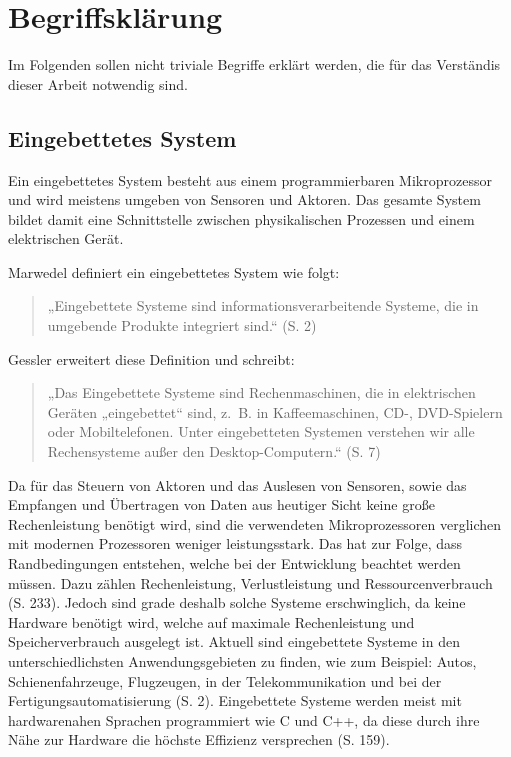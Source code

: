 \chapter{Begriffsklärung}
Im Folgenden sollen nicht triviale Begriffe erklärt werden, die für das Verständis dieser Arbeit notwendig sind.

\section{Eingebettetes System}
Ein eingebettetes System besteht aus einem programmierbaren Mikroprozessor und wird meistens umgeben von Sensoren und Aktoren. Das gesamte System bildet damit eine Schnittstelle zwischen physikalischen Prozessen und einem elektrischen Gerät.

Marwedel definiert ein eingebettetes System wie folgt:
\begin{quote}
    „Eingebettete Systeme sind informationsverarbeitende Systeme, die in umgebende Produkte integriert sind.“ (S. 2)\cite{marwedelEingebetteteSystemeGrundlagen2021}
\end{quote}

Gessler erweitert diese Definition und schreibt:
\begin{quote}
    „Das Eingebettete Systeme sind Rechenmaschinen, die in elektrischen Geräten „eingebettet“ sind, z. B. in Kaffeemaschinen, CD-, DVD-Spielern oder Mobiltelefonen.
    Unter eingebetteten Systemen verstehen wir alle Rechensysteme außer den Desktop-Computern.“ (S. 7)\cite{gesslerEntwicklungEingebetteterSysteme2014}
\end{quote}

Da für das Steuern von Aktoren und das Auslesen von Sensoren, sowie das Empfangen und Übertragen von Daten aus heutiger Sicht keine große Rechenleistung benötigt wird, sind die verwendeten Mikroprozessoren verglichen mit modernen Prozessoren weniger leistungsstark.
Das hat zur Folge, dass Randbedingungen entstehen, welche bei der Entwicklung beachtet werden müssen.
Dazu zählen Rechenleistung, Verlustleistung und Ressourcenverbrauch (S. 233)\cite{gesslerEntwicklungEingebetteterSysteme2014}.
Jedoch sind grade deshalb solche Systeme erschwinglich, da keine Hardware benötigt wird, welche auf maximale Rechenleistung und Speicherverbrauch ausgelegt ist.
Aktuell sind eingebettete Systeme in den unterschiedlichsten Anwendungsgebieten zu finden, wie zum Beispiel: Autos, Schienenfahrzeuge, Flugzeugen, in der Telekommunikation und bei der Fertigungsautomatisierung (S. 2)\cite{marwedelEingebetteteSystemeGrundlagen2021}.
Eingebettete Systeme werden meist mit hardwarenahen Sprachen programmiert wie C und C++, da diese durch ihre Nähe zur Hardware die höchste Effizienz versprechen (S. 159)\cite{gesslerEntwicklungEingebetteterSysteme2014}.

